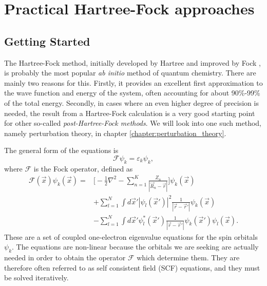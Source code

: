 \chapter{Practical Hartree-Fock approaches}\label{chap:hartreefock}


\section{Getting Started}

The Hartree-Fock method, initially developed by Hartree \cite{hartree} and improved by Fock \cite{Fock},
is probably the most popular \emph{ab initio} method of quantum chemistry. There are mainly two reasons for this.
Firstly, it  provides an excellent first approximation to the wave function and energy of the system, often accounting
for about 90\%-99\% of the total energy. Secondly, in cases where an even higher degree of precision is needed, the result from a Hartree-Fock calculation
is a very good starting point for other so-called \emph{post-Hartree-Fock methods}. We will look into one such method, namely perturbation
theory, in chapter \ref{chapter:perturbation_theory}.

The general form of the equations is
\begin{equation}
 \mathcal{F}\psi_k = \varepsilon_k \psi_k,
\end{equation}
where $\mathcal{F}$ is the Fock operator, defined as
\begin{equation}
\begin{split}
 \mathcal{F}(\vec x)\psi_k(\vec x)  = & \Big[-\frac{1}{2}\nabla^2 - \sum_{n=1}^K\frac{Z_n}{|\vec R_n - \vec r|}\Big]\psi_k(\vec x) \\
                                      & +  \sum_{l=1}^N\int d\vec x'|\psi_l(\vec x')|^2\frac{1}{|\vec r - \vec r'|}\psi_k(\vec x) \\
                                      & - \sum_{l=1}^N \int d\vec x'\psi^*_l(\vec x')\frac{1}{|\vec r - \vec r'|}\psi_k(\vec x')\psi_l(\vec x).
\end{split}
\end{equation}
These are a set of coupled one-electron eigenvalue equations for the spin orbitals $\psi_k$.
The equations are non-linear because the orbitals we are seeking are
actually needed in order to obtain the operator $\mathcal{F}$ which determine them. They are therefore often referred to as self consistent field (SCF)
equations, and they must be solved iteratively.

